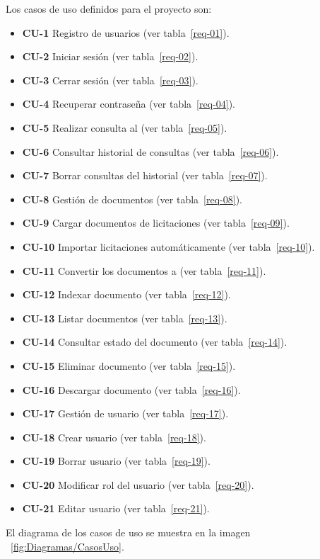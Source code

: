 Los casos de uso definidos para el proyecto son:
\begin{itemize}
\tightlist
	\item \textbf{CU-1} Registro de usuarios (ver tabla~\ref{req-01}).
	\item \textbf{CU-2} Iniciar sesión (ver tabla~\ref{req-02}).
	\item \textbf{CU-3} Cerrar sesión (ver tabla~\ref{req-03}).
	\item \textbf{CU-4} Recuperar contraseña (ver tabla~\ref{req-04}).
	\item \textbf{CU-5} Realizar consulta al  (ver tabla~\ref{req-05}).
	\item \textbf{CU-6} Consultar historial de consultas (ver tabla~\ref{req-06}).
	\item \textbf{CU-7} Borrar consultas del historial (ver tabla~\ref{req-07}).
	\item \textbf{CU-8} Gestión de documentos (ver tabla~\ref{req-08}).
	\item \textbf{CU-9} Cargar documentos de licitaciones (ver tabla~\ref{req-09}).
	\item \textbf{CU-10} Importar licitaciones automáticamente (ver tabla~\ref{req-10}).
	\item \textbf{CU-11} Convertir los documentos a  (ver tabla~\ref{req-11}).
	\item \textbf{CU-12} Indexar documento (ver tabla~\ref{req-12}).
	\item \textbf{CU-13} Listar documentos (ver tabla~\ref{req-13}).
	\item \textbf{CU-14} Consultar estado del documento (ver tabla~\ref{req-14}).
	\item \textbf{CU-15} Eliminar documento (ver tabla~\ref{req-15}).
	\item \textbf{CU-16} Descargar documento (ver tabla~\ref{req-16}).
	\item \textbf{CU-17} Gestión de usuario (ver tabla~\ref{req-17}).
	\item \textbf{CU-18} Crear usuario (ver tabla~\ref{req-18}).
	\item \textbf{CU-19} Borrar usuario (ver tabla~\ref{req-19}).
	\item \textbf{CU-20} Modificar rol del usuario (ver tabla~\ref{req-20}).
	\item \textbf{CU-21} Editar usuario (ver tabla~\ref{req-21}).
\end{itemize}
El diagrama de los casos de uso se muestra en la imagen ~\ref{fig:Diagramas/CasosUso}.

